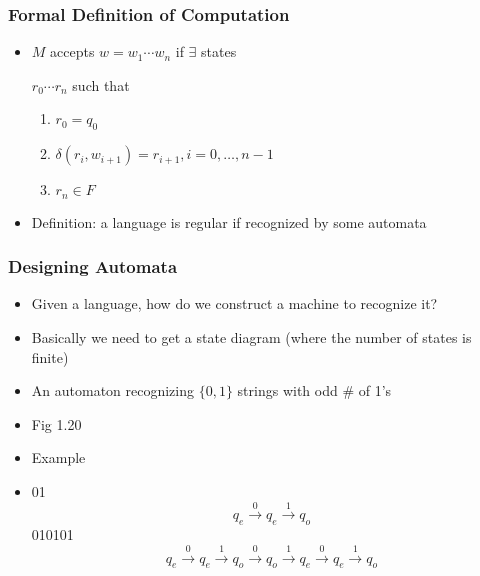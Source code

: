 



\begin{frame}[allowframebreaks] \frametitle{Formal Definition of Computation}
  \begin{itemize}
\item $M$ accepts $w=w_1 \cdots w_n$ if $\exists$ states

 $r_0 \cdots r_n$ such that
  \begin{enumerate}
  \item $r_0 = q_0$
  \item $\delta(r_i, w_{i+1})= r_{i+1}, i = 0, \ldots, n-1$
  \item $r_n \in F$
  \end{enumerate}
\item \alert{Definition}:
  a language is regular if recognized by some automata
\end{itemize}\end{frame} \begin{frame}[allowframebreaks] \frametitle{Designing Automata}
  \begin{itemize}
\item Given a language, how do we construct a machine to recognize it?
\item Basically we need to get a state diagram (where the number
  of states is finite)
\item An automaton recognizing $\{0,1\}$ strings with odd
\# of 1's 

\item []Fig 1.20

\begin{center}
    \end{center}
\item Example

\item [] 01
  \begin{equation*}
    q_e \xrightarrow{0} q_e \xrightarrow{1} q_o
  \end{equation*}
  010101
  \begin{equation*}
    q_e \xrightarrow{0} q_e \xrightarrow{1} q_o
    \xrightarrow{0} q_o \xrightarrow{1} q_e \xrightarrow{0} q_e
    \xrightarrow{1} q_o
  \end{equation*}
  

\end{itemize}
\end{frame}
